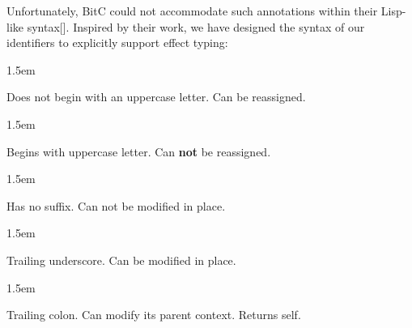 \documentclass[preprint]{{sigplanconf}}
\begin{document}
 Unfortunately, BitC could not accommodate such annotations within their
 Lisp-like syntax[]. Inspired by their work, we have designed the
 syntax of our identifiers to explicitly support effect typing:%

\begin{mddefinitions}%


\begin{mdbmarginx}{}{}{}{1.5em}%
\begin{mddefdata}%
Does not begin with an uppercase letter. Can be reassigned. 
\end{mddefdata}%
\end{mdbmarginx}%


\begin{mdbmarginx}{}{}{}{1.5em}%
\begin{mddefdata}%
Begins with uppercase letter. Can \textbf{not} be reassigned. 
\end{mddefdata}%
\end{mdbmarginx}%


\begin{mdbmarginx}{}{}{}{1.5em}%
\begin{mddefdata}%
Has no suffix. Can not be modified in place.
\end{mddefdata}%
\end{mdbmarginx}%


\begin{mdbmarginx}{}{}{}{1.5em}%
\begin{mddefdata}%
Trailing underscore. Can be modified in place.
\end{mddefdata}%
\end{mdbmarginx}%


\begin{mdbmarginx}{}{}{}{1.5em}%
\begin{mddefdata}%
Trailing colon. Can modify its parent context. Returns self.%
\end{mddefdata}%
\end{mdbmarginx}%
\end{mddefinitions}%
\end{document}
